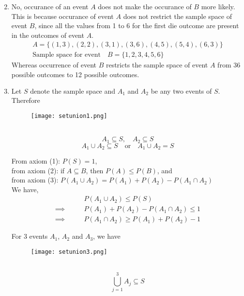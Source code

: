 \documentclass[11pt]{article}
\begin{document}
\begin{enumerate}[1: ]
\setcounter{enumi}{1}
\item No, occurance of an event $A$ does not make the occurance of $B$ more 
	likely. This is because occurance of event $A$ does not restrict the 
	sample space of event $B$, since all the values from 1 to 6 for the 
	first die outcome are present in the outcomes of event $A$.
	\begin{align*} 
	A = \{(1,3),(2,2),(3,1),(3,6),(4,5),(5,4),(6,3)\} \\
		\text{Sample space for event} \quad B = \{1,2,3,4,5,6\} 
	\end{align*} 
	Whereas occurrence of event $B$ restricts the sample space of event $A$
		from 36 possible outcomes to 12 possible outcomes.
\item Let $S$ denote the sample space and $A_1$ and $A_2$ be any two events of
	$S$. Therefore
	\begin{figure}[H]
		\centering
	\begin{minipage}{0.5\linewidth} 
	\texttt{[image: setunion1.png]}
	\end{minipage} \quad
	\begin{minipage}[c]{0.2\linewidth} ~\hfill
		\[ A_1 \subseteq S, \quad A_2 \subseteq S \]
		\[ A_1 \cup A_2 \subseteq S \quad \text{or} \quad
					A_1 \cup A_2 = S
		\]
	\end{minipage}
	\vspace*{-1ex}
	\end{figure}

	From axiom (1): $P(S)=1$, \\
	from axiom (2): if $A \subseteq B$, then $P(A) \le P(B)$, and\\
	from axiom (3): $ P(A_1\cup A_2) = P(A_1) + P(A_2) 
			- P(A_1\cap A_2)$ \\
	We have, 
	\begin{align} 
		&P(A_1\cup A_2) \le P(S) \nonumber \\
	\implies \qquad & P(A_1) + P(A_2) - P(A_1\cap A_2) \le 1 \nonumber \\
	\implies \qquad & P(A_1\cap A_2) \ge P(A_1) + P(A_2) - 1
	\end{align} 

	For 3 events $A_1$, $A_2$ and $A_3$, we have
	\begin{figure}[H]
		\centering
	\begin{minipage}{0.5\linewidth} 
	\texttt{[image: setunion3.png]}
	\end{minipage} \quad
	\begin{minipage}[c]{0.2\linewidth} ~\hfill
		\[ \bigcup_{j=1}^{3} A_j \subseteq S \]
	\end{minipage}
	\vspace*{-1ex}
	\end{figure}


\end{enumerate}
\end{document}
